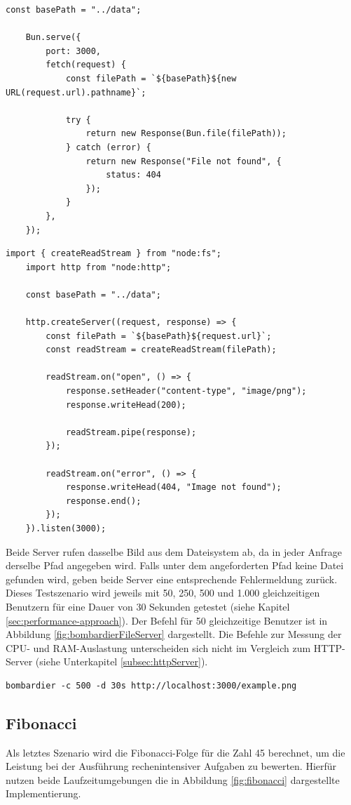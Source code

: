 \begin{lstlisting}[caption={Datei-Server Bun},label={fig:fileServerBun}]
	const basePath = "../data";
	
	Bun.serve({
		port: 3000,
		fetch(request) {
			const filePath = `${basePath}${new URL(request.url).pathname}`;
			
			try {
				return new Response(Bun.file(filePath));
			} catch (error) {
				return new Response("File not found", {
					status: 404
				});
			}
		},
	});
\end{lstlisting}

\begin{lstlisting}[caption={Datei-Server Node.js},label={fig:fileServerNode}]
	import { createReadStream } from "node:fs";
	import http from "node:http";
	
	const basePath = "../data";
	
	http.createServer((request, response) => {
		const filePath = `${basePath}${request.url}`;
		const readStream = createReadStream(filePath);
		
		readStream.on("open", () => {
			response.setHeader("content-type", "image/png");
			response.writeHead(200);
			
			readStream.pipe(response);
		});
		
		readStream.on("error", () => {
			response.writeHead(404, "Image not found");
			response.end();
		});
	}).listen(3000);
\end{lstlisting}

\noindent
Beide Server rufen dasselbe Bild aus dem Dateisystem ab, da in jeder Anfrage derselbe Pfad angegeben wird. Falls unter dem angeforderten Pfad keine Datei gefunden wird, geben beide Server eine entsprechende Fehlermeldung zurück. Dieses Testszenario wird jeweils mit 50, 250, 500 und 1.000 gleichzeitigen Benutzern für eine Dauer von 30 Sekunden getestet (siehe Kapitel \ref{sec:performance-approach}). Der Befehl für 50 gleichzeitige Benutzer ist in Abbildung \ref{fig:bombardierFileServer} dargestellt. Die Befehle zur Messung der CPU- und RAM-Auslastung unterscheiden sich nicht im Vergleich zum HTTP-Server (siehe Unterkapitel \ref{subsec:httpServer}).

\begin{lstlisting}[caption={Bombardier Datei-Server},label={fig:bombardierFileServer}]
	bombardier -c 500 -d 30s http://localhost:3000/example.png
\end{lstlisting}

\subsection{Fibonacci} \label{subsec:fibonacci}
Als letztes Szenario wird die Fibonacci-Folge für die Zahl 45 berechnet, um die Leistung bei der Ausführung rechenintensiver Aufgaben zu bewerten. Hierfür nutzen beide Laufzeitumgebungen die in Abbildung \ref{fig:fibonacci} dargestellte Implementierung.

